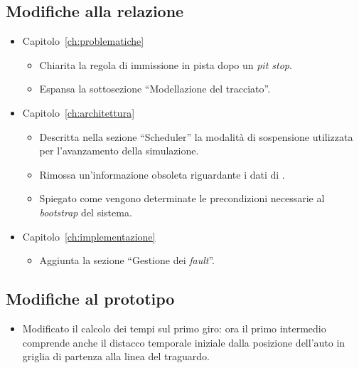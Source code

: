 \subsection*{Modifiche alla relazione}
\begin{itemize}
\item Capitolo~\ref{ch:problematiche}
	\begin{itemize}
	\item Chiarita la regola di immissione in pista dopo un \textit{pit stop}.
	\item Espansa la sottosezione ``Modellazione del tracciato''.
	\end{itemize}
\item Capitolo~\ref{ch:architettura}
	\begin{itemize}
	\item Descritta nella sezione ``Scheduler'' la modalità di sospensione utilizzata per l'avanzamento della simulazione.
	\item Rimossa un'informazione obsoleta riguardante i dati di \car{}.
	\item Spiegato come vengono determinate le precondizioni necessarie al \textit{bootstrap} del sistema.
	\end{itemize}
\item Capitolo~\ref{ch:implementazione}
	\begin{itemize}
	\item Aggiunta la sezione ``Gestione dei \textit{fault}''.
	\end{itemize}
\end{itemize}

\subsection*{Modifiche al prototipo}
\begin{itemize}
	\item Modificato il calcolo dei tempi sul primo giro: ora il primo intermedio comprende anche il distacco temporale iniziale dalla posizione dell'auto in griglia di partenza alla linea del traguardo.
\end{itemize}
